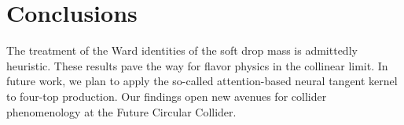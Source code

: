 \section{Conclusions}\label{sec:conclusions}

The treatment of the Ward identities of the soft drop mass is admittedly
heuristic. These results pave the way for flavor physics in the
collinear limit. In future work, we plan to apply the so-called
attention-based neural tangent kernel to four-top production. Our
findings open new avenues for collider phenomenology at the Future
Circular Collider.

